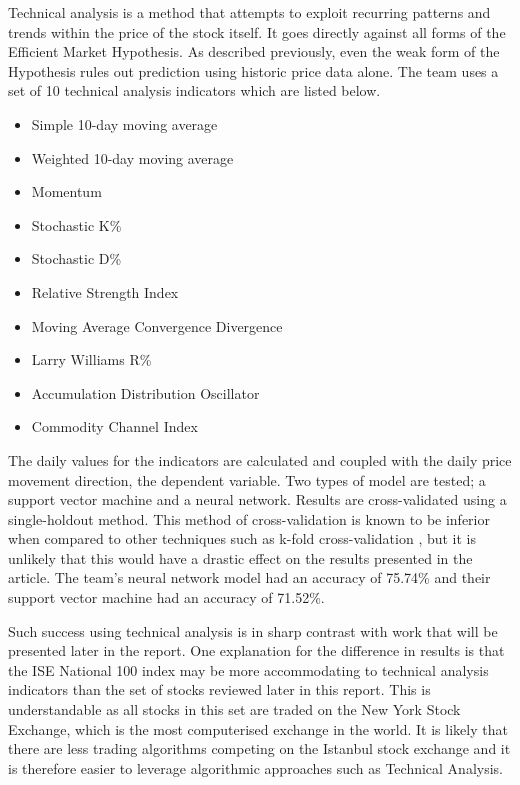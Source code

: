 \documentclass{report}
\begin{document}
Technical analysis is a method that attempts to exploit recurring patterns and trends within the price of the stock itself. It goes directly against all forms of the Efficient Market Hypothesis. As described previously, even the weak form of the Hypothesis rules out prediction using historic price data alone. The team uses a set of 10 technical analysis indicators which are listed below.

\begin{itemize}[noitemsep]
  \item Simple 10-day moving average
  \item Weighted 10-day moving average
  \item Momentum
  \item Stochastic K\%
  \item Stochastic D\%
  \item Relative Strength Index
  \item Moving Average Convergence Divergence
  \item Larry Williams R\%
  \item Accumulation Distribution Oscillator
  \item Commodity Channel Index
\end{itemize}

The daily values for the indicators are calculated and coupled with the daily price movement direction, the dependent variable. Two types of model are tested; a support vector machine and a neural network. Results are cross-validated using a single-holdout method. This method of cross-validation is known to be inferior when compared to other techniques such as k-fold cross-validation \cite{kohavi1995study}, but it is unlikely that this would have a drastic effect on the results presented in the article. The team's neural network model had an accuracy of 75.74\% and their support vector machine had an accuracy of 71.52\%.

Such success using technical analysis is in sharp contrast with work that will be presented later in the report. One explanation for the difference in results is that the ISE National 100 index may be more accommodating to technical analysis indicators than the set of stocks reviewed later in this report. This is understandable as all stocks in this set are traded on the New York Stock Exchange, which is the most computerised exchange in the world. It is likely that there are less trading algorithms competing on the Istanbul stock exchange and it is therefore easier to leverage algorithmic approaches such as Technical Analysis.
\end{document}
